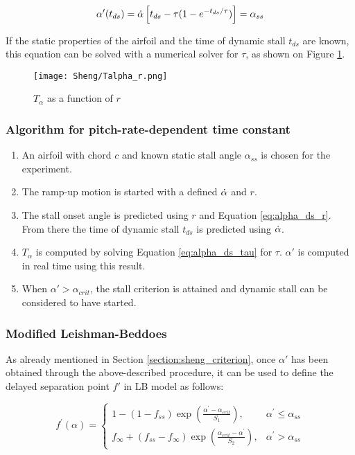 \begin{equation}
\alpha'(t_{ds}) = \dot{\alpha}\left[t_{ds} - \tau(1-e^{-t_{ds} / \tau})\right] = \alpha_{ss}
\label{eq:alpha_ds_tau}
\end{equation}

If the static properties of the airfoil and the time of dynamic stall $t_{ds}$ are known, this equation can be solved with a numerical solver for $\tau$, as shown on Figure \ref{fig:Talpha_r}.

\begin{figure}[h]
	\centering
	\texttt{[image: Sheng/Talpha\_r.png]}
	\caption{$T_\alpha$ as a function of $r$}
	\label{fig:Talpha_r}
\end{figure}

\subsubsection{Algorithm for pitch-rate-dependent time constant}

\begin{enumerate}
\item An airfoil with chord $c$ and known static stall angle $\alpha_{ss}$ is chosen for the experiment. 
\item The ramp-up motion is started with a defined $\dot{\alpha}$ and $r$.
\item The stall onset angle is predicted using $r$ and Equation \eqref{eq:alpha_ds_r}. From there the time of dynamic stall $t_{ds}$ is predicted using $\dot{\alpha}$.
\item $T_\alpha$ is computed by solving Equation  \eqref{eq:alpha_ds_tau} for $\tau$. $\alpha'$ is computed in real time using this result. 
\item When $\alpha' > \alpha_{crit}$, the stall criterion is attained and dynamic stall can be considered to have started. 
\end{enumerate}

\subsubsection{Modified Leishman-Beddoes}
\label{section:Sheng-LB}

As already mentioned in Section \ref{section:sheng_criterion}, once $\alpha'$ has been obtained through the above-described procedure, it can be used to define the delayed separation point $f'$ in LB model as follows: 

\begin{equation}
	f^{\prime}(\alpha)=\left\{\begin{array}{ll}
		1-(1-f_{ss}) \exp \left(\frac{\alpha^{\prime}-\alpha_{crit}}{S_{1}}\right), & \alpha^{\prime} \leq \alpha_{ss} \\
		f_\infty + (f_{ss}-f_\infty) \exp \left(\frac{\alpha_{crit}-\alpha^{\prime}}{S_{2}}\right), & \alpha^{\prime}>\alpha_{ss}
		\end{array}\right.
		\label{eq:fp_sheng}
\end{equation}

